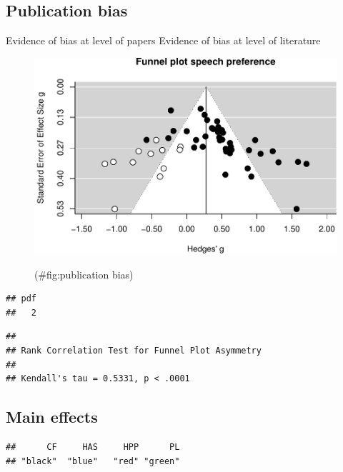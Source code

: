 \documentclass[man]{apa6}
\begin{document}
\subsection{Publication bias}\label{publication-bias}

Evidence of bias at level of papers Evidence of bias at level of
literature

\begin{figure}

{\centering \includegraphics{MA_speech_pref_files/figure-latex/publication bias-1} 

}

\caption{ }(\#fig:publication bias)
\end{figure}

\begin{verbatim}
## pdf 
##   2
\end{verbatim}

\begin{verbatim}
## 
## Rank Correlation Test for Funnel Plot Asymmetry
## 
## Kendall's tau = 0.5331, p < .0001
\end{verbatim}

\subsection{Main effects}\label{main-effects}

\begin{verbatim}
##      CF     HAS     HPP      PL 
## "black"  "blue"   "red" "green"
\end{verbatim}
\end{document}
